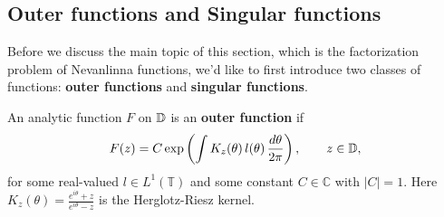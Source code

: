 \subsection{Outer functions and Singular functions}
Before we discuss the main topic of this section, which is the factorization problem of
Nevanlinna functions, we'd like to first introduce two classes of functions: 
\textbf{outer functions} and \textbf{singular functions}.
\begin{definition}\label{def:outer_function}
An analytic function $F$ on $\mathbb{D}$ is an \textbf{outer function} if
\begin{equation*}
  F(z)=C\exp\left(\int K_z(\theta)\,l(\theta)\,\frac{d\theta}{2\pi}\right),
  \qquad z\in\mathbb{D},
\end{equation*}
for some real-valued $l\in L^1(\mathbb{T})$ and some constant $C\in\mathbb{C}$ with $|C|=1$.
Here $K_z(\theta)=\frac{e^{i\theta}+z}{e^{i\theta}-z}$ is the Herglotz-Riesz kernel.
\end{definition}

